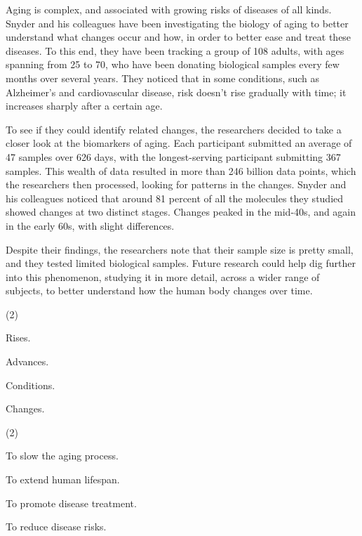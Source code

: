 \documentclass{英语试卷}
\begin{document}
\par Aging is complex, and associated with growing risks of diseases of all kinds. Snyder and his colleagues have been investigating the biology of aging to better understand what changes occur and how, in order to better ease and treat these diseases. To this end, they have been tracking a group of 108 adults, with ages spanning from 25 to 70, who have been donating biological samples every few months over several years. They noticed that in some conditions, such as Alzheimer's and cardiovascular disease, risk doesn't rise gradually with time; it increases sharply after a certain age.\par
\par To see if they could identify related changes, the researchers decided to take a closer look at the biomarkers of aging. Each participant submitted an average of 47 samples over 626 days, with the longest-serving participant submitting 367 samples. This wealth of data resulted in more than 246 billion data points, which the researchers then processed, looking for patterns in the changes. Snyder and his colleagues noticed that around 81 percent of all the molecules they studied showed changes at two distinct stages. Changes peaked in the mid-40s, and again in the early 60s, with slight differences.\par
\par Despite their findings, the researchers note that their sample size is pretty small, and they tested limited biological samples. Future research could help dig further into this phenomenon, studying it in more detail, across a wider range of subjects, to better understand how the human body changes over time.\par
{}
\begin{choices}(2)
  \item Rises.
  \item Advances.
  \item Conditions.
  \item Changes.
\end{choices}
\begin{choices}(2)
  \item To slow the aging process.
  \item To extend human lifespan.
  \item To promote disease treatment.
  \item To reduce disease risks.
\end{choices}
\end{document}
